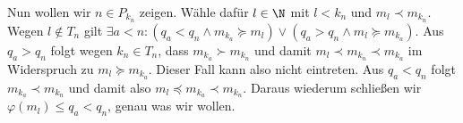 \begin{solution}
    Nun wollen wir $n \in P_{k_n}$ zeigen. Wähle dafür $l \in \N$ mit $l < k_n$ und $m_l \prec m_{k_n}$. Wegen $l \notin T_n$ gilt $\exists a < n: (q_a < q_n \land m_{k_a} \succeq m_l) \lor (q_a > q_n \land m_l \succeq m_{k_a})$. 
    Aus $q_a > q_n$ folgt wegen $k_n \in T_n$, dass $m_{k_a} \succ m_{k_n}$ und damit $m_l \prec m_{k_n} \prec m_{k_a}$ im Widerspruch zu $m_l \succeq m_{k_a}$. Dieser Fall kann also nicht eintreten.
    Aus $q_a < q_n$ folgt $m_{k_a} \prec m_{k_n}$ und damit also $m_l \preceq m_{k_a} \prec m_{k_n}$. Daraus wiederum schließen wir $\varphi(m_l) \leq q_a < q_n$, genau was wir wollen. 
    

\end{solution}